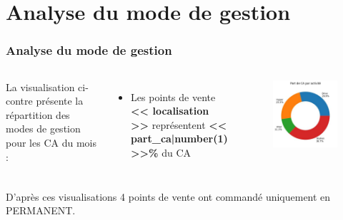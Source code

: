 \documentclass{beamer}
\begin{document}
    \section{Analyse du mode de gestion}

    \begin{frame}
        \tiny
        \frametitle{Analyse du mode de gestion}

        \begin{columns}
            La visualisation ci-contre présente la répartition des modes de gestion pour les CA du mois :

            \begin{itemize}
                \item{Les points de vente \textbf{<< localisation >>} représentent \textbf{<< part_ca|number(1) >>\%} du CA}
            \end{itemize}

            \centering

            \begin{figure}[h]
                \centering
                \includegraphics[width=1\textwidth]{assets/ca_par_mode_de_gestion}
            \end{figure}
        \end{columns}

        D’après ces visualisations {4} points de vente ont commandé uniquement en PERMANENT.
    \end{frame}
\end{document}
